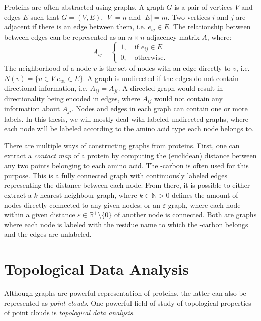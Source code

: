 Proteins are often abstracted using graphs. A graph $G$ is a pair of vertices
$V$ and edges $E$ such that $G=(V, E)$, $|V|=n$ and $|E|=m$. Two vertices $i$
and $j$ are adjacent if there is an edge between them, i.e. $e_{ij}\in E$. The
relationship between between edges can be represented as an $n\times n$
adjacency matrix $A$, where:
\begin{equation}
  \label{eq:adjacency}
  A_{ij}=\begin{cases}
    1, \quad\text{if } e_{ij}\in E\\
    0, \quad\text{otherwise.}
  \end{cases}
\end{equation}
The neighborhood of a node $v$ is the set of nodes with an edge directly to $v$,
i.e. $N(v) = \{ u\in V|e_{uv} \in E \}$. A graph is undirected if the edges do
not contain directional information, i.e. $A_{ij}=A_{ji}$. A directed graph
would result in directionality being encoded in edges, where $A_{ij}$ would not
contain any information about $A_{ji}$. Nodes and edges in each graph can
contain one or more labels. In this thesis, we will mostly deal with labeled
undirected graphs, where each node will be labeled according to the amino acid
type each node belongs to.

There are multiple ways of constructing graphs from proteins. First, one can
extract a \emph{contact map} of a protein by computing the (euclidean) distance
between any two points belonging to each amino acid. The \textalpha-carbon is
often used for this purpose. This is a fully connected graph with continuously
labeled edges representing the distance between each node. From there, it is
possible to either extract a $k$-nearest neighbour graph, where
$k\in\mathbb{N}>0$ defines the amount of nodes directly connected to any given
nodes; or an $\varepsilon$-graph, where each node within a given distance
$\varepsilon\in\mathbb{R^+}\setminus \{0\}$ of another node is connected. Both
are graphs where each node is labeled with the residue name to which the
\textalpha{}-carbon belongs and the edges are unlabeled.

\section{Topological Data Analysis}

Although graphs are powerful representation of proteins, the latter can also be
represented as \emph{point clouds}. One powerful field of study of topological
properties of point clouds is \emph{topological data analysis}.

